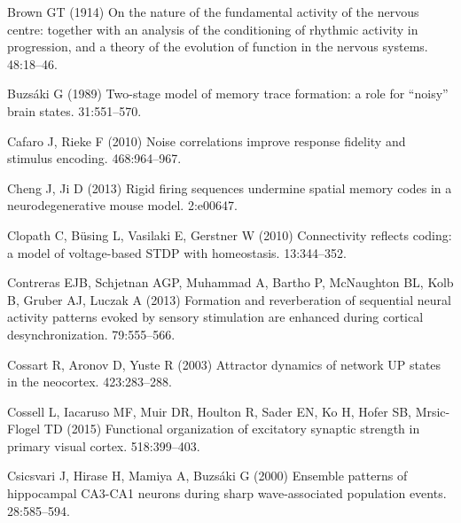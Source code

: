 \begin{thebibliography}{}
Brown GT (1914{\rm{}})
\newblock On the nature of the fundamental activity of the nervous centre: together 
with an analysis of the conditioning of rhythmic activity in progression, and a 
theory of the evolution of function in the nervous systems.
 48:18--46.

Buzs\'{a}ki G (1989{\rm{}})
\newblock Two-stage model of memory trace formation: a role for ``noisy'' brain
  states.
 31:551--570.

Cafaro J, Rieke F (2010{\rm{}})
\newblock Noise correlations improve response fidelity and stimulus encoding.
 468:964--967.

Cheng J, Ji D (2013{\rm{}})
\newblock Rigid firing sequences undermine spatial memory codes in a neurodegenerative mouse model.
 2:e00647.

Clopath C, B{\"u}sing L, Vasilaki E, Gerstner W (2010{\rm{}})
\newblock Connectivity reflects coding: a model of voltage-based STDP with
  homeostasis.
 13:344--352.

Contreras EJB, Schjetnan AGP, Muhammad A, Bartho P, McNaughton BL, Kolb B, Gruber AJ, Luczak A (2013{\rm{}})
\newblock Formation and reverberation of sequential neural activity patterns evoked by sensory stimulation are enhanced during cortical desynchronization.
 79:555--566.

Cossart R, Aronov D, Yuste R (2003{\rm{}})
\newblock Attractor dynamics of network UP states in the neocortex.
 423:283--288.

Cossell L, Iacaruso MF, Muir DR, Houlton R, Sader EN, Ko H, Hofer SB,  Mrsic-Flogel TD (2015{\rm{}})
\newblock Functional organization of excitatory synaptic strength in primary visual cortex.
 518:399--403.

Csicsvari J, Hirase H, Mamiya A, Buzs\'{a}ki G (2000{\rm{}})
\newblock Ensemble patterns of hippocampal CA3-CA1 neurons during sharp wave-associated population events.
 28:585--594.


\end{thebibliography}
